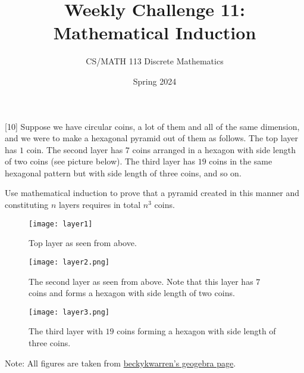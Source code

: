 \documentclass[a4paper]{exam}
\title{Weekly Challenge 11: Mathematical Induction}
\author{CS/MATH 113 Discrete Mathematics}
\date{Spring 2024}
\begin{document}
\maketitle

\begin{questions}
  [10]
    Suppose we have circular coins, a lot of them and all of the same dimension, and we were to make a hexagonal pyramid out of them as follows. The top layer has $1$ coin. The second layer has $7$ coins arranged in a hexagon with side length of two coins (see picture below). The third layer has $19$ coins in the same hexagonal pattern but with side length of three coins, and so on.

    Use mathematical induction to prove that a pyramid created in this manner and constituting $n$ layers requires in total $n^3$ coins.
  \begin{figure}[h!]
    \centerline{\texttt{[image: layer1]}}
    \caption{Top layer as seen from above.}
    \label{layer1}
  \end{figure}
  \begin{figure}[h!]
    \centerline{\texttt{[image: layer2.png]}}
    \caption{The second layer as seen from above. Note that this layer has $7$ coins and forms a hexagon with side length of two coins.}
    \label{layer2}
  \end{figure}
  \newpage
  \begin{figure}[h!]
    \centerline{\texttt{[image: layer3.png]}}
    \caption{The third layer with $19$ coins forming a hexagon with side length of three coins.}
    \label{layer3}
  \end{figure}

  Note: All figures are taken from \href{https://www.geogebra.org/m/cnqdjcph}{beckykwarren's geogebra page}.

  \begin{solution}
    

\end{solution}
\end{questions}
\end{document}

